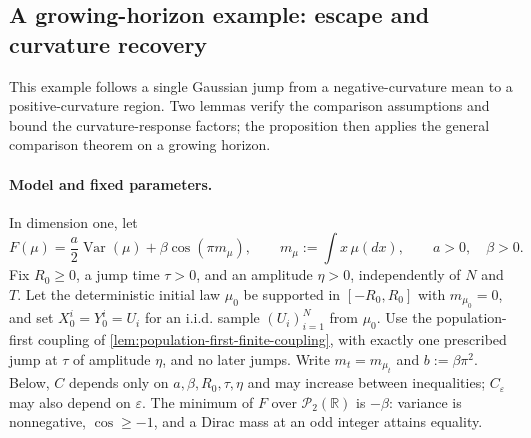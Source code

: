 \subsection{A growing-horizon example: escape and curvature recovery}
\label{subsec:canonical-variance-cosine}

This example follows a single Gaussian jump from a negative-curvature
mean to a positive-curvature region. Two lemmas verify the comparison
assumptions and bound the curvature-response factors; the proposition then
applies the general comparison theorem on a growing horizon.

\paragraph{Model and fixed parameters.}
In dimension one, let
\begin{equation}
 F(\mu)=\frac a2\operatorname{Var}(\mu)+\beta\cos(\pi m_\mu),
 \qquad m_\mu:=\int x\,\mu(dx),\qquad a>0,\quad\beta>0.
 \label{eq:canonical-objective}
\end{equation}
Fix $R_0\ge0$, a jump time $\tau>0$, and an amplitude $\eta>0$,
independently of $N$ and $T$. Let the deterministic initial law $\mu_0$
be supported in $[-R_0,R_0]$ with $m_{\mu_0}=0$, and set
$X_0^i=Y_0^i=U_i$ for an i.i.d. sample $(U_i)_{i=1}^N$ from $\mu_0$.
Use the population-first coupling of
\cref{lem:population-first-finite-coupling}, with exactly one prescribed
jump at $\tau$ of amplitude $\eta$, and no later jumps.
Write $m_t=m_{\mu_t}$ and $b:=\beta\pi^2$.
Below, $C$ depends only on $a,\beta,R_0,\tau,\eta$ and may increase
between inequalities; $C_\varepsilon$ may also depend on $\varepsilon$.
The minimum of $F$ over $\mathcal P_2(\mathbb R)$ is $-\beta$:
variance is nonnegative, $\cos\ge-1$, and a Dirac mass at an odd integer
attains equality.


